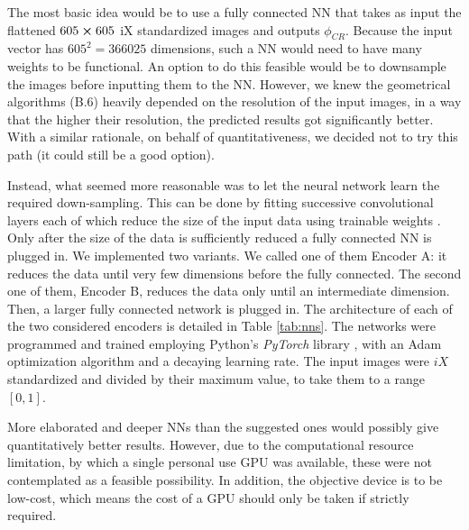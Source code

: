\documentclass[11pt, a4paper, twoside]{article} %
\begin{document}
The most basic idea would be to use a fully connected NN \cite{NN} that takes as input the flattened $605\cross 605$ iX standardized images and outputs $\phi_{CR}$. Because the input vector has $605^2=366025$ dimensions, such a NN would need to have many weights to be functional. An option to do this feasible would be to downsample the images before inputting them to the NN. However, we knew the geometrical algorithms (B.6) heavily depended on the resolution of the input images, in a way that the higher their resolution, the predicted results got significantly better. With a similar rationale, on behalf of quantitativeness, we decided not to try this path (it could still be a good option).%

Instead, what seemed more reasonable was to let the neural network learn the required down-sampling. This can be done by fitting successive convolutional layers each of which reduce the size of the input data using trainable weights \cite{NN}. Only after the size of the data is sufficiently reduced a fully connected NN is plugged in. We implemented two variants. We called one of them Encoder A: it reduces the data until very few dimensions before the fully connected. The second one of them, Encoder B, reduces the data only until an intermediate dimension. Then, a larger fully connected network is plugged in. The architecture of each of the two considered encoders is detailed in Table \ref{tab:nns}. The networks were programmed and trained employing Python's {\em PyTorch} library \cite{pytorch}, with an Adam optimization algorithm \cite{adam} and a decaying learning rate. The input images were $iX$ standardized and divided by their maximum value, to take them to a range $[0,1]$.%

More elaborated and deeper NNs than the suggested ones would possibly give quantitatively better results. However, due to the computational resource limitation, by which a single personal use GPU was available, these were not contemplated as a feasible possibility. In addition, the objective device is to be low-cost, which means the cost of a GPU should only be taken if strictly required.%
\end{document}
